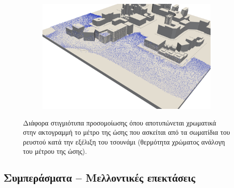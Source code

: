 \begin{figure}
\begin{subfigure}{.5\textwidth}
  \end{subfigure}
  \begin{subfigure}{.5\textwidth}
    \centering
    \includegraphics[width=\textwidth]{figures/impulses-3.png}
  \end{subfigure}
  \caption[Ώσεις στην ακτογραμμή]{Διάφορα στιγμιότυπα προσομοίωσης όπου αποτυπώνεται
    χρωματικά στην ακτογραμμή το μέτρο της ώσης που ασκείται από τα σωματίδια του ρευστού
    κατά την εξέλιξη του τσουνάμι (θερμότητα χρώματος ανάλογη του μέτρου της ώσης).}
  \label{fig:impulses}
\end{figure}

\subsection{Συμπεράσματα -- Μελλοντικές επεκτάσεις}
